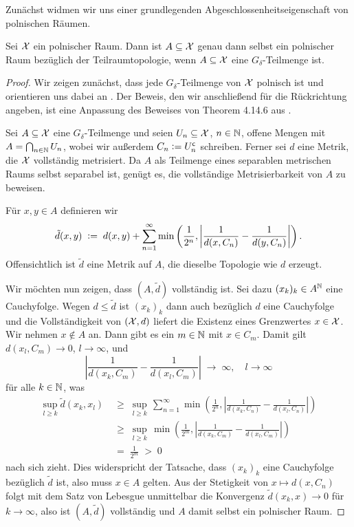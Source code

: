 \documentclass[../thesis/thesis.tex]{subfiles}
\begin{document}
	Zunächst widmen wir uns einer grundlegenden Abgeschlossenheitseigenschaft von polnischen Räumen.
	
	\begin{Satz}[Alexandroff]
		\label{satz:alexandroff}
		Sei $\mathcal{X}$ ein polnischer Raum. Dann ist $A \subseteq \mathcal{X}$ genau dann selbst ein polnischer Raum bezüglich der Teilraumtopologie, 
		wenn $A \subseteq \mathcal{X}$ eine $G_\delta$-Teilmenge ist.
	\end{Satz}
	
	\begin{proof}
		Wir zeigen zunächst, dass jede $G_\delta$-Teilmenge von $\mathcal{X}$ polnisch ist und orientieren uns dabei an \cite[Theorem 7]{JordanBell.2014}. Der Beweis, den wir anschließend für 
		die Rückrichtung angeben, ist eine Anpassung des Beweises von Theorem 4.14.6 aus \cite{Simon.2015}.
		
		Sei $A \subseteq \mathcal{X}$ eine $G_\delta$-Teilmenge und seien 
		$U_n \subseteq \mathcal{X}$, $n \in \mathbb{N}$, offene Mengen mit 
		$A = \bigcap_{n \in \mathbb{N}} U_n$, wobei wir außerdem 
		$C_n \vcentcolon = U_n^{\mathsf{c}}$ schreiben. Ferner sei 
		$d$ eine Metrik, die $\mathcal{X}$ vollständig metrisiert. 
		Da $A$ als Teilmenge eines separablen metrischen Raums 
		selbst separabel ist, genügt es, die vollständige Metrisierbarkeit 
		von $A$ zu beweisen.
		
		Für $x, y \in A$ definieren wir
		\[\tilde{d}(x, y) \; \vcentcolon = \; d(x, y) + \sum_{n=1}^{\infty} \min \left(
		\frac{1}{2^n}, \left| \frac{1}{d(x, C_n)} - \frac{1}{d(y, C_n)} \right|
		\right) \text{.}\]
		Offensichtlich ist $\tilde{d}$ eine Metrik auf $A$, 
		die dieselbe Topologie wie $d$ erzeugt. 
		
		Wir möchten nun zeigen, dass $(A, \tilde{d})$ vollständig ist. 
		Sei dazu $(x_k)_k \in A^{\mathbb{N}}$ eine Cauchyfolge. Wegen $d \leq \tilde{d}$ 
		ist $(x_k)_k$ dann auch bezüglich $d$ eine Cauchyfolge und die 
		Vollständigkeit von $(\mathcal{X}, d)$ liefert die Existenz eines Grenzwertes 
		$x \in \mathcal{X}$. Wir nehmen $x \notin A$ an. Dann gibt es ein $m \in \mathbb{N}$ mit 
		$x \in C_m$. Damit gilt $d(x_l, C_m) \to 0$, $l \to \infty$, und
		$$ \left| \frac{1}{d(x_k, C_m)} -
		\frac{1}{d(x_l, C_m)} \right| \; \to \; \infty, \quad l \to \infty$$
		für alle $k \in \mathbb{N}$, was
		\begin{align*}
			\sup_{l \geq k} \tilde{d}(x_k, x_l) \; &\geq \; \sup_{l \geq k} \, \sum_{n=1}^{\infty} \min \left(\frac{1}{2^n}, \left| \frac{1}{d(x_k, C_n)} -\frac{1}{d(x_l, C_n)} \right|\right) \\
			                                       &\geq \; \sup_{l \geq k} \, \min \left(\frac{1}{2^m}, \left| \frac{1}{d(x_k, C_m)} -\frac{1}{d(x_l, C_m)} \right|\right) \\
			                                       &=    \; \frac{1}{2^m} \; > \; 0
		\end{align*}
		nach sich zieht. Dies widerspricht der Tatsache, dass $(x_k)_k$ eine Cauchyfolge 
		bezüglich $\tilde{d}$ ist, also muss $x \in A$ gelten. 
		Aus der Stetigkeit von $x \mapsto d(x, C_n)$ folgt mit dem 
		Satz von Lebesgue unmittelbar die Konvergenz 
		$\tilde{d}(x_k, x) \to 0$ für $k \to \infty$,
		also ist $(A, \tilde{d})$ vollständig und $A$ damit selbst ein
		polnischer Raum.
		

\end{proof}
\end{document}
